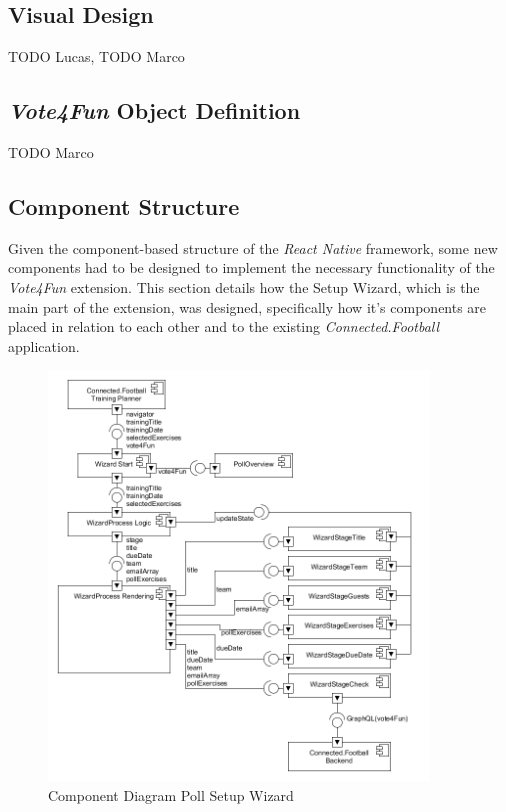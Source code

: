 \subsection{Visual Design}
\label{ssec:visual_design}

TODO Lucas, TODO Marco

\subsection{\textit{Vote4Fun} Object Definition}
\label{ssec:vote4fun_object_definition}

TODO Marco

\subsection{Component Structure}
\label{ssec:component_structure}

Given the component-based structure of the \textit{React Native} framework, some new components had to be designed to implement the necessary functionality of the \textit{Vote4Fun} extension. This section details how the Setup Wizard, which is the main part of the extension, was designed, specifically how it's components are placed in relation to each other and to the existing \textit{Connected.Football} application.

\begin{figure}[H]
    \begin{center}
        \includegraphics[width=0.9\textwidth]{images/diagrams/component_diagrams/ComponentDiagram_Wizard.png}
        \caption{Component Diagram Poll Setup Wizard}
        \label{fig:component_diagram_wizard}
    \end{center}
\end{figure}


